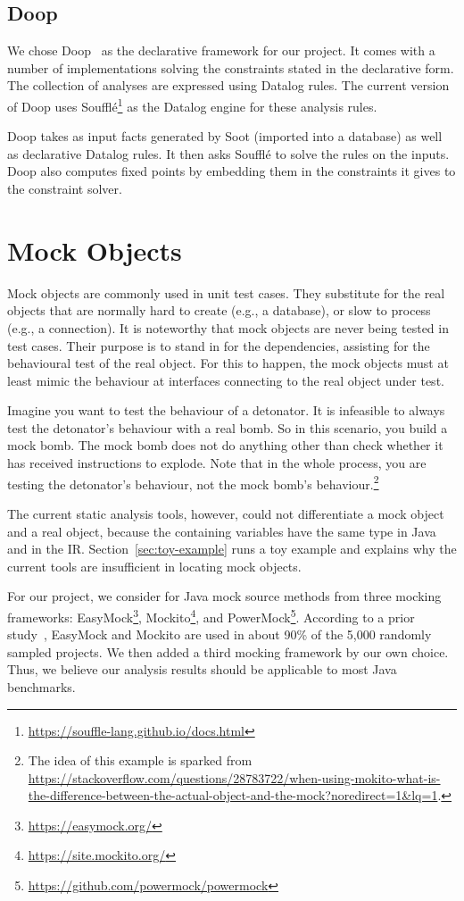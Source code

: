\subsection{Doop}

We chose Doop~\cite{bravenboer09:_stric_declar_specif_sophis_point_analy} as the declarative framework for our project. It comes with a number of implementations solving the constraints stated in the declarative form. The collection of analyses are expressed using Datalog rules. The current version of Doop uses Soufflé\footnote{\url{https://souffle-lang.github.io/docs.html}} as the Datalog engine for these analysis rules.

Doop takes as input facts generated by Soot (imported into a database) as well as declarative Datalog rules. It then asks Soufflé to solve the rules on the inputs. Doop also computes fixed points by embedding them in the constraints it gives to the constraint solver.


\section{Mock Objects} 

Mock objects are commonly used in unit test cases. They substitute for the real objects that are normally hard to create (e.g., a database), or slow to process (e.g., a connection). It is noteworthy that mock objects are never being tested in test cases. Their purpose is to stand in for the dependencies, assisting for the behavioural test of the real object. For this to happen, the mock objects must at least mimic the behaviour at interfaces connecting to the real object under test.

Imagine you want to test the behaviour of a detonator. It is infeasible to always test the detonator's behaviour with a real bomb. So in this scenario, you build a mock bomb. The mock bomb does not do anything other than check whether it has received instructions to explode. Note that in the whole process, you are testing the detonator's behaviour, not the mock bomb's behaviour.\footnote{The idea of this example is sparked from \url{https://stackoverflow.com/questions/28783722/when-using-mokito-what-is-the-difference-between-the-actual-object-and-the-mock?noredirect=1&lq=1}.}

The current static analysis tools, however, could not differentiate a mock object and a real object, because the containing variables have the same type in Java and in the IR. Section~\ref{sec:toy-example} runs a toy example and explains why the current tools are insufficient in locating mock objects.

For our project, we consider for Java mock source methods from three mocking frameworks: EasyMock\footnote{\url{https://easymock.org/}}, Mockito\footnote{\url{https://site.mockito.org/}}, and PowerMock\footnote{\url{https://github.com/powermock/powermock}}. According to a prior study~\cite{mostafa14:_empirical_study_mock_frameworks}, EasyMock and Mockito are used in about 90\% of the 5,000 randomly sampled projects. We then added a third mocking framework by our own choice. Thus, we believe our analysis results should be applicable to most Java benchmarks. 